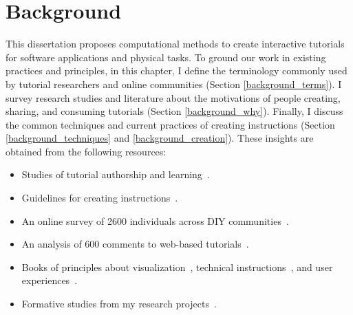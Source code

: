
\chapter{Background}
\label{chapter_background}

This dissertation proposes computational methods to create interactive tutorials for software applications and physical tasks. To ground our work in existing practices and principles, in this chapter, I define the terminology commonly used by tutorial researchers and online communities (Section \ref{background_terms}).
%
I survey research studies and literature about the motivations of people creating, sharing, and consuming tutorials (Section \ref{background_why}). Finally, I discuss the common techniques and current practices of creating instructions (Section \ref{background_techniques} and \ref{background_creation}).
%
These insights are obtained from the following resources:
\begin{itemize}
  \item Studies of tutorial authorship and learning~\cite{Torrey:2007he,Torrey:2009fc,Wakkary:2015:TAH:2702123.2702550,Black:1986:KMI:29933.275623,Tseng:2014:PVP:2598510.2598540}.
  \item Guidelines for creating instructions~\cite{InstructableHowTo,wikiHowHowTo}.
  \item An online survey of 2600 individuals across DIY communities~\cite{Kuznetsov:2010:REA:1868914.1868950}.
  \item An analysis of 600 comments to web-based tutorials~\cite{BenLafreniere:2013ux}.
  \item Books of principles about visualization~\cite{tufte1990envisioning}, technical instructions~\cite{mijksenaar1999open,Smith03iimanufacturer}, and user experiences~\cite{greenberg2012sketching,Buxton:2007:SUE:1526229}.
  \item Formative studies from my research projects~\cite{Chi:2012:MAG:2380116.2380130,Chi:2014:DRS:2556288.2557254,Chi:2013:DGC:2501988.2502052,Chi:2016:DemoDraw}.
\end{itemize}

